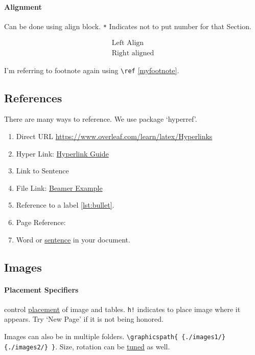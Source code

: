 \documentclass{report}[a4paper,12pt] %
\begin{document}
\paragraph{Alignment} Can be done using align block. 
\verb|*| Indicates not to put number for that Section.

\begin{align*}
  \text{Left Align}\\
  \text{Right aligned}
\end{align*}

I'm referring to footnote again using \verb|\ref| \ref{myfootnote}.

\subsection{References}
There are many ways to reference. We use package `hyperref'.
\begin{enumerate}
  \item Direct URL \url{https://www.overleaf.com/learn/latex/Hyperlinks}
  \item Hyper Link: \href{https://www.overleaf.com/learn/latex/Hyperlinks}{Hyperlink Guide}
  \item Link to Sentence
  \item File Link: \href{run:../../presentation/beamer/tutorial.tex}{Beamer Example}
  \item Reference to a label \ref{lst:bullet}.
  \item Page Reference: \pageref{fig:coffee}
  \item Word or \hyperlink{sen:formatopts}{sentence} in your document.
\end{enumerate}

\newpage
\subsection{Images}

\paragraph{Placement Specifiers} control \href{https://www.overleaf.com/learn/latex/Positioning_images_and_tables#The_figure_environment}{placement} of image and tables.
\verb|h!| indicates to place image where it appears. Try `New Page' if it is not being honored.

Images can also be in multiple folders. \verb|\graphicspath{ {./images1/}{./images2/} }|.
Size, rotation can be \href{https://www.overleaf.com/learn/latex/Inserting_Images}{tuned} as well.
\end{document}

